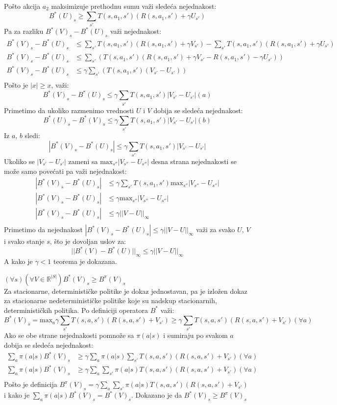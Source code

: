 \documentclass[a4paper,fleqn,12pt]{JMThesis}
\newcommand{\latin}{\fontencoding{T1}\selectfont\selectlanguage{english}}
\theoremstyle{plain}
\theoremstyle{definition}
\theoremstyle{definition}
\begin{document}
Pošto akcija $a_2$ maksimizuje prethodnu sumu važi sledeća nejednakost:
\[	B^*(U)_s \geq \sum_{s'}T(s,a_1,s')(R(s,a_1,s')+\gamma U_{s'}) \]
Pa za razliku $B^*(V)_s - B^*(U)_s$ važi nejednakost:
\[ 
	\begin{split}
		B^*(V)_s - B^*(U)_s &\leq \sum_{s'}T(s,a_1,s')(R(s,a_1,s')+\gamma V_{s'}) - \sum_{s'}T(s,a_1,s')(R(s,a_1,s')+\gamma U_{s'})\\
		B^*(V)_s - B^*(U)_s &\leq \sum_{s'}(T(s,a_1,s')(R(s,a_1,s') + \gamma V_{s'} - R(s,a_1,s') - \gamma U_{s'}))\\
		B^*(V)_s - B^*(U)_s &\leq \gamma \sum_{s'}(T(s,a_1,s')(V_{s'} - U_{s'}))\\
	\end{split}
\]
Pošto je $|x| \geq x$, važi:
\[ B^*(V)_s - B^*(U)_s \leq \gamma \sum_{s'}T(s,a_1,s')|V_{s'} - U_{s'}| (a)\]
Primetimo da ukoliko razmenimo vrednosti $U$ i $V$ dobija se sledeća nejednakost:
\[ B^*(U)_s - B^*(V)_s \leq \gamma \sum_{s'}T(s,a_1,s')|V_{s'} - U_{s'}| (b)\]
Iz $a$, $b$ sledi:
\[ |B^*(V)_s - B^*(U)_s| \leq \gamma \sum_{s'}T(s,a_1,s')|V_{s'} - U_{s'}| \] 
Ukoliko se $|V_{s'} - U_{s'}|$ zameni sa $\text{max}_{s''}|V_{s''} - U_{s''}|$ desna strana nejednakosti se može
samo povećati pa važi nejednakost:
\[ 
	\begin{split}
		|B^*(V)_s - B^*(U)_s| &\leq \gamma \sum_{s'}T(s,a_1,s')\text{max}_{s''}|V_{s''} - U_{s''}|\\
		|B^*(V)_s - B^*(U)_s| &\leq \gamma \text{max}_{s''}|V_{s''} - U_{s''}|\\
		|B^*(V)_s - B^*(U)_s| &\leq \gamma ||V - U||_{\infty}\\
	\end{split}
\] 
Primetimo da nejednakost $|B^*(V)_s - B^*(U)_s| \leq \gamma ||V - U||_{\infty}$ važi za svako $U$, $V$ 
i svako stanje $s$, što je dovoljan uslov za:
\[
	||B^*(V) - B^*(U)||_{\infty} \leq \gamma ||V - U||_{\infty}
\]
A kako je $\gamma < 1$ teorema je dokazana.

\lem $(\forall s) (\forall V \in \mathbb{R}^{|S|}) B^*(V)_s \geq B^{\pi}(V)_s$ \\
Za stacionarne, determinističke politike je dokaz jednostavan, pa je izložen dokaz za stacionarne nedeterminističke politike
koje su nadskup stacionarnih, determinističkih politika.
Po definiciji operatora $B^*$ važi:
\[
	B^*(V)_s = \text{max}_a \gamma \sum_{s'}T(s,a,s')(R(s,a,s')+V_{s'}) \geq \gamma \sum_{s'}T(s,a,s')(R(s,a,s')+V_{s'}) (\forall a) 
\]
Ako se obe strane nejednakosti pomnože sa $\pi(a|s)$ i sumiraju po svakom $a$ dobija se sledeća nejednakost:
\[
	\begin{split}
		\sum_{a} \pi(a|s) B^*(V)_s &\geq \gamma \sum_{a} \pi(a|s) \sum_{s'}T(s,a,s')(R(s,a,s')+V_{s'}) (\forall a)\\
		\sum_{a} \pi(a|s) B^*(V)_s &\geq \gamma \sum_{a} \sum_{s'}\pi(a|s) T(s,a,s')(R(s,a,s')+V_{s'}) (\forall a)\\
	\end{split}
\]
Pošto je definicija $B^{\pi}(V)_s = \gamma \sum_{a} \sum_{s'}\pi(a|s) T(s,a,s')(R(s,a,s')+V_{s'})$ i kako je $\sum_{a} \pi(a|s) B^*(V)_s = B^*(V)_s$.
Dokazano je da $B^*(V)_s \geq B^{\pi}(V)_s$
\renewcommand\bibname{ Literatura}
\latin
\printbibliography[title=Literatura]
\medskip
\end{document}
